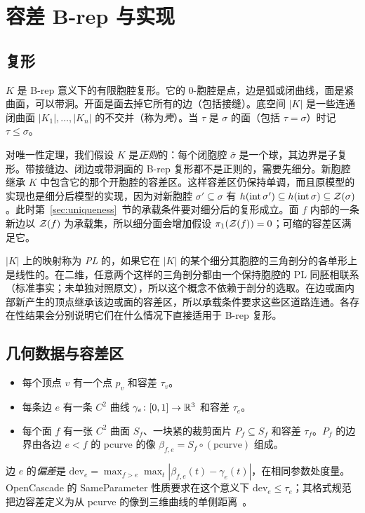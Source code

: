\section{容差 B-rep 与实现}\label{sec:setting}

\subsection{复形}
$K$ 是 B-rep 意义下的有限胞腔复形。它的 0-胞腔是点，边是弧或闭曲线，面是紧曲面，可以带洞。开面是面去掉它所有的边（包括接缝）。底空间 $|K|$ 是一些连通闭曲面 $|K_1|,\dots,|K_n|$ 的不交并（称为\emph{壳}）。当 $\tau$ 是 $\sigma$ 的面（包括 $\tau=\sigma$）时记 $\tau\le\sigma$。

对唯一性定理，我们假设 $K$ 是\emph{正则}的：每个闭胞腔 $\bar\sigma$ 是一个球，其边界是子复形。带接缝边、闭边或带洞面的 B-rep 复形都不是正则的，需要先细分。新胞腔继承 $K$ 中包含它的那个开胞腔的容差区。这样容差区仍保持单调，而且原模型的实现也是细分后模型的实现，因为对新胞腔 $\sigma'\subseteq\sigma$ 有 $h(\operatorname{int}\sigma')\subseteq h(\operatorname{int}\sigma)\subseteq\mathcal{Z}(\sigma)$。此时第~\ref{sec:uniqueness}~节的承载条件要对细分后的复形成立。面 $f$ 内部的一条新边以 $\mathcal{Z}(f)$ 为承载集，所以细分面会增加假设 $\pi_1(\mathcal{Z}(f))=0$；可缩的容差区满足它。

$|K|$ 上的映射称为 \emph{PL} 的，如果它在 $|K|$ 的某个细分其胞腔的三角剖分的各单形上是线性的。在二维，任意两个这样的三角剖分都由一个保持胞腔的 PL 同胚相联系（标准事实；未单独对照原文），所以这个概念不依赖于剖分的选取。在边或面内部新产生的顶点继承该边或面的容差区，所以承载条件要求这些区道路连通。各存在性结果会分别说明它们在什么情况下直接适用于 B-rep 复形。

\subsection{几何数据与容差区}
\begin{itemize}
\item 每个顶点 $v$ 有一个点 $p_v$ 和容差 $\tau_v$。
\item 每条边 $e$ 有一条 $C^2$ 曲线 $\gamma_e\colon[0,1]\to\mathbb{R}^3$ 和容差 $\tau_e$。
\item 每个面 $f$ 有一张 $C^2$ 曲面 $S_f$、一块紧的裁剪面片 $P_f\subseteq S_f$ 和容差 $\tau_f$。$P_f$ 的边界由各边 $e<f$ 的 pcurve 的像 $\beta_{f,e}=S_f\circ(\text{pcurve})$ 组成。
\end{itemize}
边 $e$ 的\emph{偏差}是 $\mathrm{dev}_e=\max_{f>e}\max_t|\beta_{f,e}(t)-\gamma_e(t)|$，在相同参数处度量。OpenCascade 的 SameParameter 性质要求在这个意义下 $\mathrm{dev}_e\le\tau_e$；其格式规范把边容差定义为从 pcurve 的像到三维曲线的单侧距离~\cite{OCCT}。

